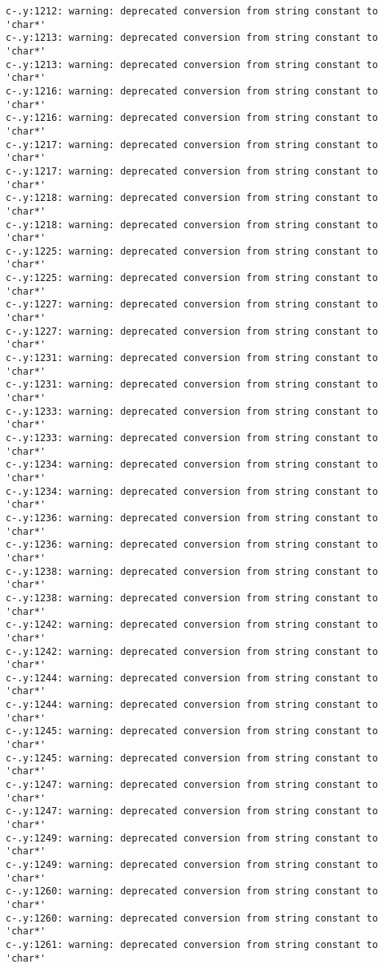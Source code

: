 \documentclass[12pt]{book}
\begin{document}
\begin{lstlisting}
c-.y:1212: warning: deprecated conversion from string constant to 'char*'
c-.y:1213: warning: deprecated conversion from string constant to 'char*'
c-.y:1213: warning: deprecated conversion from string constant to 'char*'
c-.y:1216: warning: deprecated conversion from string constant to 'char*'
c-.y:1216: warning: deprecated conversion from string constant to 'char*'
c-.y:1217: warning: deprecated conversion from string constant to 'char*'
c-.y:1217: warning: deprecated conversion from string constant to 'char*'
c-.y:1218: warning: deprecated conversion from string constant to 'char*'
c-.y:1218: warning: deprecated conversion from string constant to 'char*'
c-.y:1225: warning: deprecated conversion from string constant to 'char*'
c-.y:1225: warning: deprecated conversion from string constant to 'char*'
c-.y:1227: warning: deprecated conversion from string constant to 'char*'
c-.y:1227: warning: deprecated conversion from string constant to 'char*'
c-.y:1231: warning: deprecated conversion from string constant to 'char*'
c-.y:1231: warning: deprecated conversion from string constant to 'char*'
c-.y:1233: warning: deprecated conversion from string constant to 'char*'
c-.y:1233: warning: deprecated conversion from string constant to 'char*'
c-.y:1234: warning: deprecated conversion from string constant to 'char*'
c-.y:1234: warning: deprecated conversion from string constant to 'char*'
c-.y:1236: warning: deprecated conversion from string constant to 'char*'
c-.y:1236: warning: deprecated conversion from string constant to 'char*'
c-.y:1238: warning: deprecated conversion from string constant to 'char*'
c-.y:1238: warning: deprecated conversion from string constant to 'char*'
c-.y:1242: warning: deprecated conversion from string constant to 'char*'
c-.y:1242: warning: deprecated conversion from string constant to 'char*'
c-.y:1244: warning: deprecated conversion from string constant to 'char*'
c-.y:1244: warning: deprecated conversion from string constant to 'char*'
c-.y:1245: warning: deprecated conversion from string constant to 'char*'
c-.y:1245: warning: deprecated conversion from string constant to 'char*'
c-.y:1247: warning: deprecated conversion from string constant to 'char*'
c-.y:1247: warning: deprecated conversion from string constant to 'char*'
c-.y:1249: warning: deprecated conversion from string constant to 'char*'
c-.y:1249: warning: deprecated conversion from string constant to 'char*'
c-.y:1260: warning: deprecated conversion from string constant to 'char*'
c-.y:1260: warning: deprecated conversion from string constant to 'char*'
c-.y:1261: warning: deprecated conversion from string constant to 'char*'

\end{lstlisting}
\end{document}
